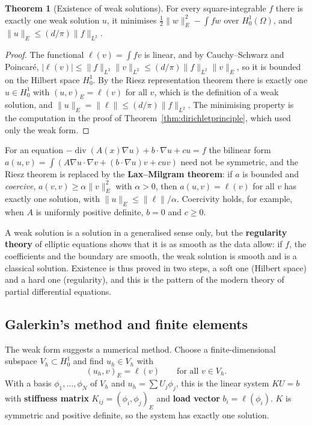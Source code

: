 \documentclass[11pt,a4paper]{article}
\numberwithin{equation}{section}
\theoremstyle{definition}
\newtheorem{thm}{Theorem}[subsection]
\begin{document}
\begin{thm}[Existence of weak solutions]
\label{thm:weakexist}
For every square-integrable $f$ there is exactly one weak solution $u$, it minimises $\frac12\|w\|_E^2 - \int fw$ over $H^1_0(\Omega)$, and $\|u\|_E \leq (d/\pi)\|f\|_{L^2}$.
\end{thm}

\begin{proof}
The functional $\ell(v) = \int fv$ is linear, and by Cauchy--Schwarz and Poincar\'e, $|\ell(v)| \leq \|f\|_{L^2}\|v\|_{L^2} \leq (d/\pi)\|f\|_{L^2}\|v\|_E$, so it is bounded on the Hilbert space $H^1_0$. By the Riesz representation theorem there is exactly one $u \in H^1_0$ with $(u, v)_E = \ell(v)$ for all $v$, which is
the definition of a weak solution, and $\|u\|_E = \|\ell\| \leq (d/\pi)\|f\|_{L^2}$. The minimising property is the computation in the proof of Theorem~\ref{thm:dirichletprinciple}, which used only the weak form.
\end{proof}

For an equation $-\operatorname{div}(A(x)\nabla u) + b\cdot\nabla u + cu = f$ the bilinear form $a(u, v) = \int(A\nabla u\cdot\nabla v + (b\cdot\nabla u)v + cuv)$ need not be symmetric, and the Riesz theorem is replaced by the \textbf{Lax--Milgram theorem}: if $a$ is bounded and \emph{coercive},
$a(v, v) \geq \alpha\|v\|_E^2$ with $\alpha > 0$, then $a(u, v) = \ell(v)$ for all $v$ has exactly one solution, with $\|u\|_E \leq \|\ell\|/\alpha$. Coercivity holds, for example, when $A$ is uniformly positive definite, $b = 0$ and $c \geq 0$.

A weak solution is a solution in a generalised sense only, but the \textbf{regularity theory} of elliptic equations shows that it is as smooth as the data allow: if $f$, the coefficients and the boundary are smooth, the weak solution is smooth and is a classical solution. Existence is thus proved in two steps, a soft
one (Hilbert space) and a hard one (regularity), and this is the pattern of the modern theory of partial differential equations.

\subsection{Galerkin's method and finite elements}
\label{ssec:galerkin}

The weak form suggests a numerical method. Choose a finite-dimensional subspace $V_h \subset H^1_0$ and find $u_h \in V_h$ with
\[
(u_h, v)_E = \ell(v) \qquad\text{for all } v \in V_h .
\]
With a basis $\phi_1, \ldots, \phi_N$ of $V_h$ and $u_h = \sum U_j\phi_j$, this is the linear system $KU = b$ with \textbf{stiffness matrix} $K_{ij} = (\phi_i, \phi_j)_E$ and \textbf{load vector} $b_i = \ell(\phi_i)$. $K$ is symmetric and positive definite, so the system has exactly one solution.
\end{document}
